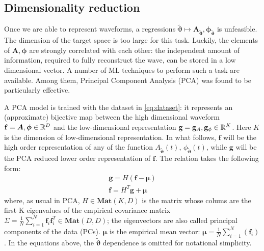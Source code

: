 \subsection{Dimensionality reduction}
Once we are able to represent waveforms, a regressions ${\tilde{\boldsymbol{\vartheta}}} \longmapsto \boldsymbol{A}_{{\tilde{\boldsymbol{\vartheta}}}}, \boldsymbol{\phi}_{{\tilde{\boldsymbol{\vartheta}}}}$ is unfeasible. The dimension of the target space is too large for this task. Luckily, the elements of $\boldsymbol{A}, \boldsymbol{\phi}$ are strongly correlated with each other: the independent amount of information, required to fully reconstruct the wave, can be stored in a low dimensional vector.
A number of ML techniques to perform such a task are available. Among them, Principal Component Analysis (PCA) \cite[ch. 12]{murphy2012machine} was found to be particularly effective.
\par
A PCA model is trained with the dataset in \eqref{eq:dataset}: it represents an (approximate) bijective map between the high dimensional waveform $\mathbf{f} = \boldsymbol{A}, \boldsymbol{\phi} \in \mathbb{R}^D$ and the low-dimensional representation $\mathbf{g} = \mathbf{g}_A , \mathbf{g}_\phi \in \mathbb{R}^K$.
Here $K$ is the dimension of low-dimensional representation.
In what follows, $\mathbf{f}$ will be the high order representation of any of the function $A_{{\tilde{\boldsymbol{\vartheta}}}}(t)$, $\phi_{{\tilde{\boldsymbol{\vartheta}}}}(t)$, while  $\mathbf{g}$ will be the PCA reduced lower order representation of $\mathbf{f}$.
The relation takes the following form:
\begin{align}
	\mathbf{g} = H (\mathbf{f} - \boldsymbol{\mu}) \label{eq:PCA_reduction_model}\\
	\mathbf{f} = H^T \mathbf{g} + \boldsymbol{\mu} \label{eq:PCA_reconstruction_model}
\end{align}
where, as usual in PCA, $H \in \mathbf{Mat}(K,D)$ is the matrix whose colums are the first K eigenvalues of the empirical covariance matrix $\Sigma = \frac{1}{N} \sum_{i=1}^N \mathbf{f}_i \mathbf{f}^T_i \in \mathbf{Mat}(D,D)$; the eigenvectors are also called principal components of the data (PCs). $\boldsymbol{\mu}$ is the empirical mean vector: ${\boldsymbol{\mu} = \frac{1}{N} \sum_{i=1}^N (\boldsymbol{f}_i)}$.
In the equations above, the ${\tilde{\boldsymbol{\vartheta}}}$ dependence is omitted for notational simplicity.
\par

